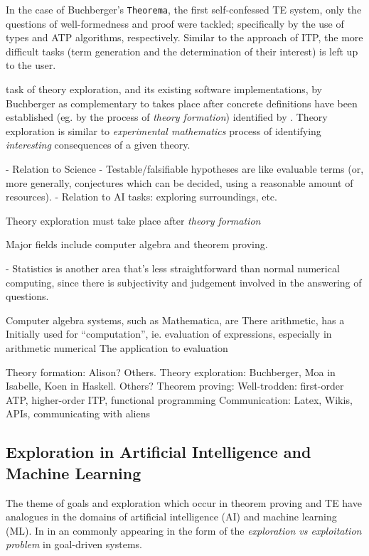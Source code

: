 \documentclass[]{article}
\begin{document}
In the case of Buchberger's \texttt{Theorema}, the first self-confessed TE system, only the questions of well-formedness and proof were tackled; specifically by the use of types and ATP algorithms, respectively. Similar to the approach of ITP, the more difficult tasks (term generation and the determination of their interest) is left up to the user.

\iffalse

  task of theory exploration, and its existing software implementations, by Buchberger as complementary to  takes place after concrete definitions have been established (eg. by the process of \emph{theory formation})  identified by . Theory exploration is similar to \emph{experimental mathematics} process of identifying \emph{interesting} consequences of a given theory.



 - Relation to Science
  - Testable/falsifiable hypotheses are like evaluable terms (or, more generally, conjectures which can be decided, using a reasonable amount of resources).
 - Relation to AI tasks: exploring surroundings, etc.

Theory exploration must take place after \emph{theory formation}

Major fields include computer algebra and theorem proving.

- Statistics is another area that's less straightforward than normal numerical computing, since there is subjectivity and judgement involved in the answering of questions.

Computer algebra systems, such as Mathematica, are
There arithmetic, has a Initially used for ``computation'', ie. evaluation of expressions,
especially in arithmetic numerical The application to evaluation

Theory formation: Alison? Others.
Theory exploration: Buchberger, Moa in Isabelle, Koen in Haskell. Others?
Theorem proving: Well-trodden: first-order ATP, higher-order ITP, functional programming
Communication: Latex, Wikis, APIs, communicating with aliens

\subsection{Exploration in Artificial Intelligence and Machine Learning}

The theme of goals and exploration which occur in theorem proving and TE have analogues in the domains of artificial intelligence (AI) and machine learning (ML). In  in an commonly appearing in the form of the \emph{exploration vs exploitation problem} in goal-driven systems.
\end{document}

